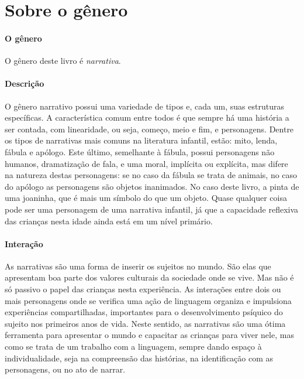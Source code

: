 \documentclass[11pt]{extarticle}
\begin{document}
\section{Sobre o gênero}

\paragraph{O gênero} O gênero deste livro é \textit{narrativa}. 

\paragraph{Descrição} 
O gênero narrativo possui uma variedade de tipos e, cada um, suas estruturas específicas.
A característica comum entre todos é que sempre há uma história a ser contada, com linearidade,
ou seja, começo, meio e fim, e personagens. 
Dentre os tipos de narrativas mais comuns na literatura infantil, estão: mito, lenda, 
fábula e apólogo. Este último, semelhante à fábula, possui personagens não humanos, 
dramatização de fala, e uma moral, implícita ou explícita, mas difere na natureza destas 
personagens: se no caso da fábula se trata de animais, no caso do apólogo as personagens 
são objetos inanimados. No caso deste livro, a pinta de uma joaninha, que é mais um 
símbolo do que um objeto. Quase qualquer coisa pode ser uma personagem de uma narrativa 
infantil, já que a capacidade reflexiva das crianças nesta idade ainda está em um nível primário. 


\paragraph{Interação} 
As narrativas são uma forma de inserir os sujeitos no mundo. 
São elas que apresentam boa parte dos valores culturais da sociedade 
onde se vive. Mas não é só passivo o papel das crianças nesta experiência. 
As interações entre dois ou mais personagens onde se verifica
uma ação de linguagem organiza e impulsiona experiências compartilhadas,
importantes para o desenvolvimento psíquico do sujeito nos primeiros anos de vida.
Neste sentido, as narrativas são uma ótima ferramenta para
apresentar o mundo e capacitar as crianças para viver nele, mas como se
trata de um trabalho com a linguagem, sempre dando espaço à individualidade, 
seja na compreensão das histórias, na identificação com as personagens, ou 
no ato de narrar. 

\end{document}

